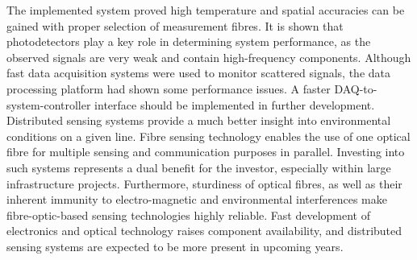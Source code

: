 \documentclass{standalone}
\begin{document}
The implemented system proved high temperature and spatial accuracies can be gained with proper selection of measurement fibres. It is shown that photodetectors play a key role in determining system performance, as the observed signals are very weak and contain high-frequency components. Although fast data acquisition systems were used to monitor scattered signals, the data processing platform had shown some performance issues. A faster DAQ-to-system-controller interface should be implemented in further development. \\

Distributed sensing systems provide a much better insight into environmental conditions on a given line. Fibre sensing technology enables the use of one optical fibre for multiple sensing and communication purposes in parallel. Investing into such systems represents a dual benefit for the investor, especially within large infrastructure projects. Furthermore, sturdiness of optical fibres, as well as their inherent immunity to electro-magnetic and environmental interferences make fibre-optic-based sensing technologies highly reliable. Fast development of electronics and optical technology raises component availability, and distributed sensing systems are expected to be more present in upcoming years.



\setcounter{stranica}{\thepage}
\addtocounter{stranica}{1}
\end{document}
